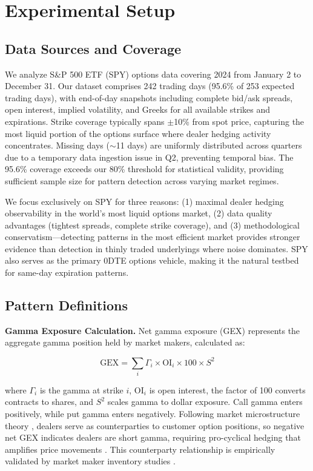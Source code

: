 \section{Experimental Setup}
\label{sec:experimental}

\subsection{Data Sources and Coverage}

We analyze S\&P 500 ETF (SPY) options data covering 2024 from January 2 to December 31. Our dataset comprises 242 trading days (95.6\% of 253 expected trading days), with end-of-day snapshots including complete bid/ask spreads, open interest, implied volatility, and Greeks for all available strikes and expirations. Strike coverage typically spans $\pm$10\% from spot price, capturing the most liquid portion of the options surface where dealer hedging activity concentrates. Missing days ($\sim$11 days) are uniformly distributed across quarters due to a temporary data ingestion issue in Q2, preventing temporal bias. The 95.6\% coverage exceeds our 80\% threshold for statistical validity, providing sufficient sample size for pattern detection across varying market regimes.

We focus exclusively on SPY for three reasons: (1) maximal dealer hedging observability in the world's most liquid options market, (2) data quality advantages (tightest spreads, complete strike coverage), and (3) methodological conservatism—detecting patterns in the most efficient market provides stronger evidence than detection in thinly traded underlyings where noise dominates. SPY also serves as the primary 0DTE options vehicle, making it the natural testbed for same-day expiration patterns.

\subsection{Pattern Definitions}

\textbf{Gamma Exposure Calculation.} Net gamma exposure (GEX) represents the aggregate gamma position held by market makers, calculated as:

\begin{equation}
\text{GEX} = \sum_{i} \Gamma_i \times \text{OI}_i \times 100 \times S^2
\end{equation}

where $\Gamma_i$ is the gamma at strike $i$, $\text{OI}_i$ is open interest, the factor of 100 converts contracts to shares, and $S^2$ scales gamma to dollar exposure. Call gamma enters positively, while put gamma enters negatively. Following market microstructure theory \cite{anderegg2022impact}, dealers serve as counterparties to customer option positions, so negative net GEX indicates dealers are short gamma, requiring pro-cyclical hedging that amplifies price movements \cite{spotgamma2019,spotgamma2021,nomura2017}. This counterparty relationship is empirically validated by market maker inventory studies \cite{dim2025zero}.

